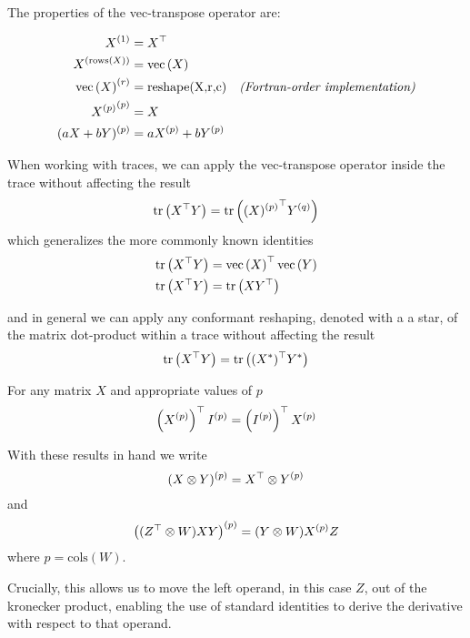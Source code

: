 The properties of the vec-transpose operator are:

\begin{align}
{ X^{(1)} } & = X^\top \\
{ X^{(\text{rows}(X))} } & = \text{vec}\left(X\right) \\
{ \text{vec}\left(X\right)^{(r)} } & = \text{reshape(X,r,c)} & \text{\emph{(Fortran-order implementation)}} \\
{ { X^{(p)} }^{(p)} } & = X \label{eqn:a_pp_is_a} \\
{ (aX + bY)^{(p)} } & = a{ X^{(p)} } + b{ Y^{(p)} }
\end{align}

When working with traces, we can apply the vec-transpose operator inside the trace without affecting the result
\begin{align}
\text{tr} \left( {X^\top Y} \right) = \text{tr} \left( {{ (X)^{(p)} }^\top { Y^{(q)} }} \right)
\end{align}
which generalizes the more commonly known identities
\begin{align}
\text{tr} \left( {X^\top Y} \right) & = \text{vec}\left(X\right)^\top\text{vec}\left(Y\right) \\
\text{tr} \left( {X^\top Y} \right) & = \text{tr} \left( {X Y^\top} \right)
\end{align}

and in general we can apply any conformant reshaping, denoted with a a star, of the matrix dot-product within a trace without affecting the result
\begin{align}
\text{tr} \left( {X^\top Y} \right) = \text{tr} \left( {(X^*)^\top Y^*} \right) \label{eqn:tr_reshape}
\end{align}

For any matrix $X$ and appropriate values of $p$
\begin{equation}
    \left({ X^{(p)} }\right)^\top { I^{(p)} } = \left({ I^{(p)} }\right)^\top { X^{(p)} } \label{eqn:dot_of_vt_of_symmetric}
\end{equation}



With these results in hand we write
\begin{equation}
{ (X \otimes Y)^{(p)} } = X^\top \otimes { Y^{(p)} } \label{eqn:vt_of_otimes}
\end{equation}
and 
\begin{equation}
{ \left((Z ^\top \otimes W)XY \right)^{(p)} } = (Y \otimes W){ X^{(p)} }Z \label{eqn:extract_left_kro_opnd}
\end{equation}
where $p = \text{cols}(W)$.

Crucially, this allows us to move the left operand, in this case $Z$, out of the kronecker product, enabling the use of standard identities to derive the derivative with respect to that operand.

